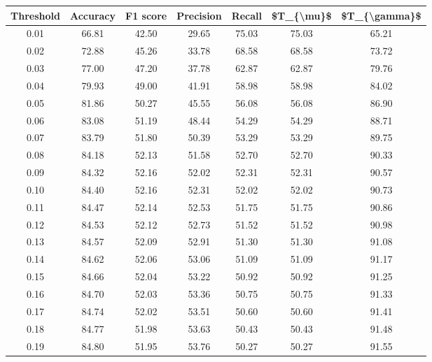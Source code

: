 \begin{tabular}{|c|c|c|c|c|c|c|}
\toprule
 Threshold &  Accuracy &  F1 score &  Precision &  Recall &  \$T\_\{\textbackslash mu\}\$ &  \$T\_\{\textbackslash gamma\}\$ \\
\hline
      0.01 &     66.81 &     42.50 &      29.65 &   75.03 &      75.03 &         65.21 \\
      0.02 &     72.88 &     45.26 &      33.78 &   68.58 &      68.58 &         73.72 \\
      0.03 &     77.00 &     47.20 &      37.78 &   62.87 &      62.87 &         79.76 \\
      0.04 &     79.93 &     49.00 &      41.91 &   58.98 &      58.98 &         84.02 \\
      0.05 &     81.86 &     50.27 &      45.55 &   56.08 &      56.08 &         86.90 \\
      0.06 &     83.08 &     51.19 &      48.44 &   54.29 &      54.29 &         88.71 \\
      0.07 &     83.79 &     51.80 &      50.39 &   53.29 &      53.29 &         89.75 \\
      0.08 &     84.18 &     52.13 &      51.58 &   52.70 &      52.70 &         90.33 \\
      0.09 &     84.32 &     52.16 &      52.02 &   52.31 &      52.31 &         90.57 \\
      0.10 &     84.40 &     52.16 &      52.31 &   52.02 &      52.02 &         90.73 \\
      0.11 &     84.47 &     52.14 &      52.53 &   51.75 &      51.75 &         90.86 \\
      0.12 &     84.53 &     52.12 &      52.73 &   51.52 &      51.52 &         90.98 \\
      0.13 &     84.57 &     52.09 &      52.91 &   51.30 &      51.30 &         91.08 \\
      0.14 &     84.62 &     52.06 &      53.06 &   51.09 &      51.09 &         91.17 \\
      0.15 &     84.66 &     52.04 &      53.22 &   50.92 &      50.92 &         91.25 \\
      0.16 &     84.70 &     52.03 &      53.36 &   50.75 &      50.75 &         91.33 \\
      0.17 &     84.74 &     52.02 &      53.51 &   50.60 &      50.60 &         91.41 \\
      0.18 &     84.77 &     51.98 &      53.63 &   50.43 &      50.43 &         91.48 \\
      0.19 &     84.80 &     51.95 &      53.76 &   50.27 &      50.27 &         91.55 \\

\end{tabular}

